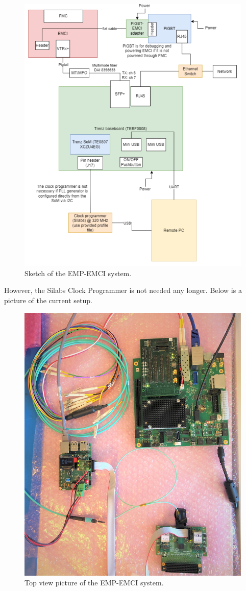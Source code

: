 \begin{figure}[H]
    \centering
    \includegraphics[width=.9\textwidth]{Graphics/pic_3.png}
    \caption{Sketch of the EMP-EMCI system.}
    \label{fig:2243}
\end{figure}

\noindent However, the Silabs Clock Programmer is not needed any longer. Below is a picture of the current setup. 

\begin{figure}[H]
    \centering
    \includegraphics[width=.7\textwidth, angle=90]{Graphics/empemcipigbt.jpg}
    \caption{Top view picture of the EMP-EMCI system.}
    \label{fig:EMP_start}
\end{figure}

